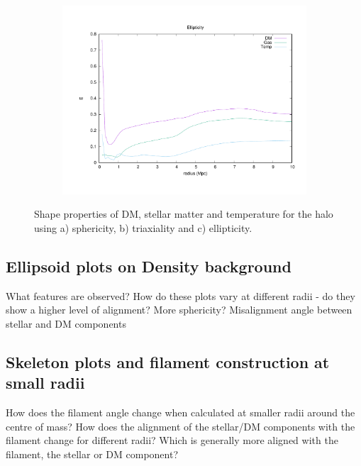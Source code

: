 \documentclass[journal]{IEEEtran}
\begin{document}
\begin{figure}[!t]
\begin{subfigure}[t]{0.3\textwidth}
		\includegraphics[width=\linewidth]{Ellipticity.pdf}
	\end{subfigure}
\label{fig:shapes}
	\caption{Shape properties of DM, stellar matter and temperature for the halo using a) sphericity, b) triaxiality and c) ellipticity.}
\end{figure}

\subsection{Ellipsoid plots on Density background}
What features are observed? How do these plots vary at different radii - do they show a higher level of alignment? More sphericity? 
Misalignment angle between stellar and DM components
\subsection{Skeleton plots and filament construction at small radii}
How does the filament angle change when calculated at smaller radii around the centre of mass?
How does the alignment of the stellar/DM components with the filament change for different radii?
Which is generally more aligned with the filament, the stellar or DM component?
\end{document}
